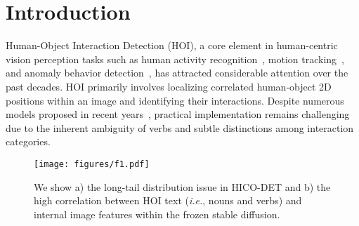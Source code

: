 \documentclass{article}
\begin{document}
\section{Introduction}

Human-Object Interaction Detection (HOI), a core element in human-centric vision perception tasks such as human activity recognition~\cite{heilbron2015activitynet}, motion tracking~\cite{yi2022physical}, and anomaly behavior detection~\cite{liu2018future}, has attracted considerable attention over the past decades. 
HOI primarily involves localizing correlated human-object 2D positions within an image and identifying their interactions.
Despite numerous models proposed in recent years~\cite{hou2020visual,wan2019pose,liao2022gen,wu2022mining,zhang2021mining,zhou2022human}, practical implementation remains challenging due to the inherent ambiguity of verbs and subtle distinctions among interaction categories.

















\begin{figure*}[t]
\texttt{[image: figures/f1.pdf]}
        \vspace{-0.5cm}
    \caption{We show a) the long-tail distribution issue in HICO-DET and b) the high correlation between HOI text (\textit{i.e.}, nouns and verbs) and internal image features within the frozen stable diffusion. }
    \label{fig:intro}
    \vspace{-0.6cm}
\end{figure*}
\end{document}
